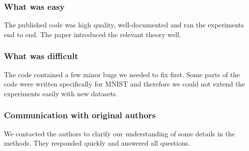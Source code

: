 \subsubsection*{What was easy}

The published code was high quality, well-documented and ran the experiments end to end. The paper introduced the relevant theory well.

\subsubsection*{What was difficult}

The code contained a few minor bugs we needed to fix first. Some parts of the code were written specifically for MNIST and therefore we could not extend the experiments easily with new datasets.

\subsubsection*{Communication with original authors}

We contacted the authors to clarify our understanding of some details in the methods. They responded quickly and answered all questions.